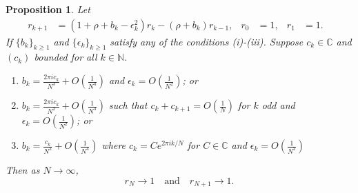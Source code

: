 \documentclass{amsart}
\newtheorem{prop}{Proposition}
\theoremstyle{remark}
\theoremstyle{definition}
\newcommand{\lp}{\left(}
\newcommand{\rp}{\right)}
\begin{document}
\begin{prop}\label{prop:rklimits}  
	Let 
	\begin{align*}
		r_{k+1} &= (1+\rho+b_k-\epsilon_k^2)r_k - (\rho+b_k)r_{k-1}, & r_0&=1, & r_1 &=1. &
	\end{align*} 
    If $\{b_{k}\}_{k\geq1}$ and $\{\epsilon_{k}\}_{k\geq1}$ satisfy any of the conditions (i)-(iii).  Suppose $c_{k}\in\mathbb{C}$ and $(c_{k})$ bounded for all $k\in \mathbb{N}$.
	\begin{enumerate}
		\item[i)] $\displaystyle{b_k = \frac{2\pi ic_k}{N^3}+O\lp\frac{1}{N^4}\rp}$ and $\displaystyle{\epsilon_k= O\lp\frac{1}{N^2}\rp}$; or
		\item[ii)]  $\displaystyle{b_k = \frac{2\pi ic_k}{N^2}+O\lp\frac{1}{N^3}\rp}$ such that $\displaystyle{c_k+c_{k+1}=O\lp\frac{1}{N}\rp}$ for $k$ odd and $\displaystyle{\epsilon_k= O\lp\frac{1}{N^2}\rp}$; or 
		\item[iii)] $\displaystyle{b_k = \frac{c_{k}}{N^2}+O\lp\frac{1}{N^{4}}\rp}$ where $\displaystyle{c_{k} = Ce^{2\pi i k/N}}$ for $C\in\mathbb{C}$ and $\displaystyle{\epsilon_k= O\lp\frac{1}{N^2}\rp}$
	\end{enumerate}
	Then as $N\rightarrow\infty$,
	\begin{equation*}
		r_N\rightarrow 1\quad\text{and}\quad r_{N+1}\rightarrow 1.
	\end{equation*}
\end{prop}
\end{document}
